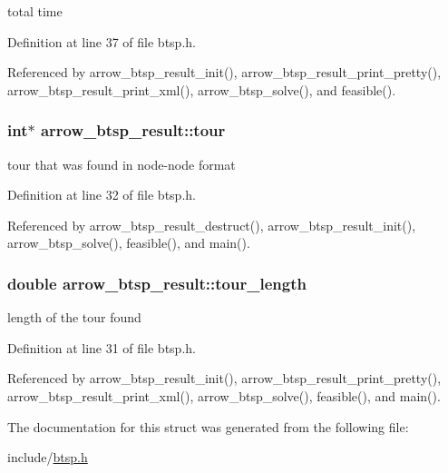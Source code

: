 total time 

Definition at line 37 of file btsp.h.

Referenced by arrow\_\-btsp\_\-result\_\-init(), arrow\_\-btsp\_\-result\_\-print\_\-pretty(), arrow\_\-btsp\_\-result\_\-print\_\-xml(), arrow\_\-btsp\_\-solve(), and feasible().\hypertarget{structarrow__btsp__result_ebd9a553dc3bf31f52eda0b293b0e272}{
\subsubsection[{tour}]{\setlength{\rightskip}{0pt plus 5cm}int$\ast$ {\bf arrow\_\-btsp\_\-result::tour}}}
\label{structarrow__btsp__result_ebd9a553dc3bf31f52eda0b293b0e272}


tour that was found in node-node format 

Definition at line 32 of file btsp.h.

Referenced by arrow\_\-btsp\_\-result\_\-destruct(), arrow\_\-btsp\_\-result\_\-init(), arrow\_\-btsp\_\-solve(), feasible(), and main().\hypertarget{structarrow__btsp__result_3c0b8827a873df71166e7fe9419c45c2}{
\subsubsection[{tour\_\-length}]{\setlength{\rightskip}{0pt plus 5cm}double {\bf arrow\_\-btsp\_\-result::tour\_\-length}}}
\label{structarrow__btsp__result_3c0b8827a873df71166e7fe9419c45c2}


length of the tour found 

Definition at line 31 of file btsp.h.

Referenced by arrow\_\-btsp\_\-result\_\-init(), arrow\_\-btsp\_\-result\_\-print\_\-pretty(), arrow\_\-btsp\_\-result\_\-print\_\-xml(), arrow\_\-btsp\_\-solve(), feasible(), and main().

The documentation for this struct was generated from the following file:\begin{CompactItemize}
\item 
include/\hyperlink{btsp_8h}{btsp.h}\end{CompactItemize}
